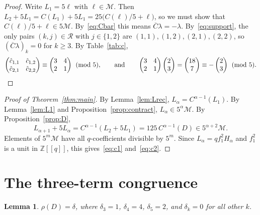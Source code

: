 \documentclass[11pt]{article}
\newtheorem{lemma}[theorem]{Lemma}
\theoremstyle{definition}
\theoremstyle{remark}
\numberwithin{equation}{section}
\newcommand{\Mod}{\mathscr{M}}
\newcommand{\Cb}{\overline{C}}
\newcommand{\Z}{\mathbb{Z}}
\begin{document}
\begin{proof}
Write $L_1=5\ell$ with $\ell\in\Mod$. Then $L_2+5L_1=C(L_1)+5L_1=25\bigl(C(\ell)/5+\ell\bigr)$, so we must show that $C(\ell)/5+\ell\in5\Mod$. By~\eqref{eq:Cbar} this means $\Cb\lambda=-\lambda$. By~\eqref{eq:support}, the only pairs $(k,j)\in\mathcal{R}$ with $j\in\{1,2\}$ are $(1,1),(1,2),(2,1),(2,2)$, so $(\Cb\lambda)_k=0$ for $k\ge3$. By Table~\ref{tab:c},
\[
\begin{pmatrix}\hat c_{1,1}&\hat c_{1,2}\\ \hat c_{2,1}&\hat c_{2,2}\end{pmatrix}\equiv\begin{pmatrix}3&4\\2&1\end{pmatrix}\pmod5,
\qquad\text{and}\qquad
\begin{pmatrix}3&4\\2&1\end{pmatrix}\begin{pmatrix}2\\3\end{pmatrix}=\begin{pmatrix}18\\7\end{pmatrix}\equiv-\begin{pmatrix}2\\3\end{pmatrix}\pmod5.\qedhere
\]
\end{proof}

\begin{proof}[Proof of Theorem~\ref{thm:main}]
By Lemma~\ref{lem:Lrec}, $L_\alpha=C^{\alpha-1}(L_1)$. By Lemma~\ref{lem:L1} and Proposition~\ref{prop:contract}, $L_\alpha\in5^\alpha\Mod$. By Proposition~\ref{prop:D},
\[
L_{\alpha+1}+5L_\alpha=C^{\alpha-1}(L_2+5L_1)=125\,C^{\alpha-1}(D)\in5^{\alpha+2}\Mod.
\]
Elements of $5^m\Mod$ have all $q$-coefficients divisible by $5^m$. Since $L_\alpha=qf_1^2H_\alpha$ and $f_1^2$ is a unit in $\Z[[q]]$, this gives~\eqref{eq:c1} and~\eqref{eq:c2}.
\end{proof}

\section{The three-term congruence}\label{sec:second}

\begin{lemma}\label{lem:delta}
$\rho(D)=\delta$, where $\delta_3=1$, $\delta_4=4$, $\delta_5=2$, and $\delta_k=0$ for all other $k$.
\end{lemma}
\end{document}
